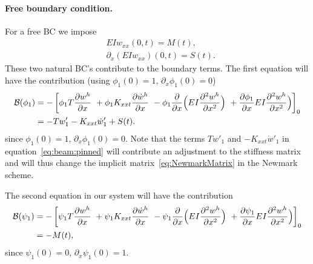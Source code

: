 \documentclass[11pt]{article}
\begin{document}
\paragraph{Free boundary condition.} For a free BC we impose
\begin{align}
&    E I w_{xx}(0,t)=M(t), \\
&   \partial_x( E I w_{xx})(0,t)=S(t) .
\end{align}
These two natural BC's contribute to the boundary terms.
The first equation will have the contribution (using $\phi_1(0)=1$, $\partial_x\phi_1(0)=0$)
\begin{align}
   \mathcal{B}(\phi_1) &= -\left[ \phi_1 T \frac{\partial w^h}{\partial x} 
                      ~ + \phi_1 K_{xxt} \frac{\partial \dot w^h}{\partial x}  
                      ~ - \phi_1 \frac{\partial}{\partial x}\Big( E I \frac{\partial^2 w^h}{\partial x^2}\Big) 
                      ~ + \frac{\partial \phi_1}{\partial x}E I \frac{\partial^2 w^h}{\partial x^2}\Big)  
                      \right]_0  \\
     &=  -T w'_1 - K_{xxt} \dot w'_1  + S(t) . \label{eq:beam:pinned}
\end{align}
since $\phi_1(0)=1$, $\partial_x\phi_1(0)=0$.
Note that the terms $T w'_1$ and $- K_{xxt} \dot w'_1$
in equation~\eqref{eq:beam:pinned} will contribute an adjustment to the stiffness matrix
and will thus change the implicit matrix~\eqref{eq:NewmarkMatrix} in the Newmark scheme.


The second equation in our system will have the contribution 
\begin{align}
   \mathcal{B}(\psi_1) &= -\left[\psi_1 T \frac{\partial w^h}{\partial x} 
                      ~ + \psi_1 K_{xxt} \frac{\partial \dot w^h}{\partial x} 
                      ~ - \psi_1 \frac{\partial}{\partial x}\Big( E I \frac{\partial^2 w^h}{\partial x^2}\Big) 
                      ~ + \frac{\partial \psi_1}{\partial x}E I \frac{\partial^2 w^h}{\partial x^2}\Big)  
                      \right]_0 \\
        &= - M(t) , 
\end{align}
since $\psi_1(0)=0$, $\partial_x\psi_1(0)=1$.

\end{document}
